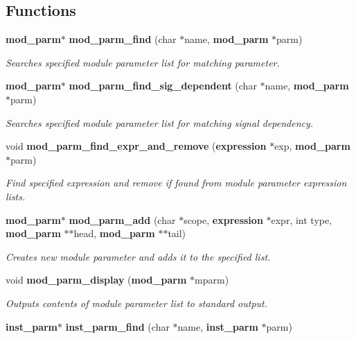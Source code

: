 \subsection*{Functions}
\begin{CompactItemize}
\item 
{\bf mod\_\-parm}$\ast$ {\bf mod\_\-parm\_\-find} (char $\ast$name, {\bf mod\_\-parm} $\ast$parm)
\begin{CompactList}\small\item\em Searches specified module parameter list for matching parameter.\item\end{CompactList}\item 
{\bf mod\_\-parm}$\ast$ {\bf mod\_\-parm\_\-find\_\-sig\_\-dependent} (char $\ast$name, {\bf mod\_\-parm} $\ast$parm)
\begin{CompactList}\small\item\em Searches specified module parameter list for matching signal dependency.\item\end{CompactList}\item 
void {\bf mod\_\-parm\_\-find\_\-expr\_\-and\_\-remove} ({\bf expression} $\ast$exp, {\bf mod\_\-parm} $\ast$parm)
\begin{CompactList}\small\item\em Find specified expression and remove if found from module parameter expression lists.\item\end{CompactList}\item 
{\bf mod\_\-parm}$\ast$ {\bf mod\_\-parm\_\-add} (char $\ast$scope, {\bf expression} $\ast$expr, int type, {\bf mod\_\-parm} $\ast$$\ast$head, {\bf mod\_\-parm} $\ast$$\ast$tail)
\begin{CompactList}\small\item\em Creates new module parameter and adds it to the specified list.\item\end{CompactList}\item 
void {\bf mod\_\-parm\_\-display} ({\bf mod\_\-parm} $\ast$mparm)
\begin{CompactList}\small\item\em Outputs contents of module parameter list to standard output.\item\end{CompactList}\item 
{\bf inst\_\-parm}$\ast$ {\bf inst\_\-parm\_\-find} (char $\ast$name, {\bf inst\_\-parm} $\ast$parm)

\end{CompactItemize}
